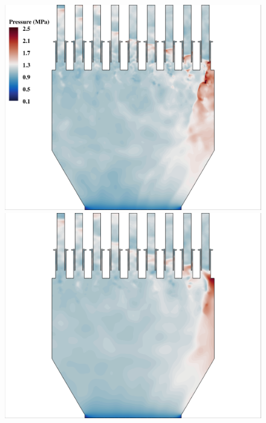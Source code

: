 \begin{figure}
	{\begin{minipage}{0.32\linewidth}
		\includegraphics[width=0.99\linewidth,trim={0.5em 0.5em 15.0em 0.5em},clip]{Chapters/HPROMResults/Images/nineElem/unsampled/fom_pressure_z.png}
	\end{minipage}
	\begin{minipage}{0.32\linewidth}
		\includegraphics[width=0.99\linewidth,trim={0.5em 0.5em 15.0em 0.5em},clip]{Chapters/HPROMResults/Images/nineElem/unsampled/rom_k25_pressure_z.png}
	\end{minipage}
	\begin{minipage}{0.32\linewidth}

\end{minipage}}
\end{figure}
